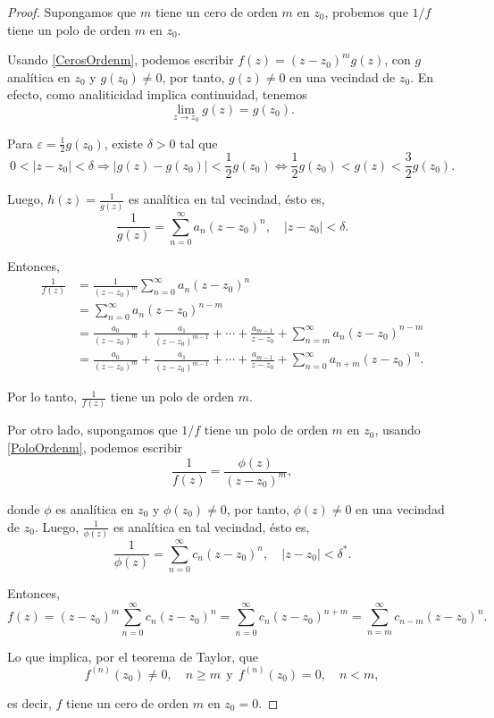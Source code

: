 \begin{proof}
Supongamos que $m$ tiene un cero de orden $m$ en $z_0$, probemos que $1/f$ tiene un polo de orden $m$ en $z_0$. 

Usando \eqref{CerosOrdenm}, podemos escribir $f(z) = (z-z_0)^m g(z)$, con $g$ analítica en $z_0$ y $g(z_0) \neq 0$, por tanto, $g(z) \neq 0$ en una vecindad de $z_0$. En efecto, como analiticidad implica continuidad, tenemos
$$\lim_{z\to z_0} g(z) = g(z_0).$$

Para $\varepsilon = \frac{1}{2} g(z_0)$, existe $\delta >0$ tal que
$$0 < |z-z_0| < \delta \Rightarrow |g(z) - g(z_0)| < \frac{1}{2} g(z_0) \Leftrightarrow \frac{1}{2} g(z_0) < g(z) < \frac{3}{2} g(z_0).$$

Luego, $h(z) = \frac{1}{g(z)}$ es analítica en tal vecindad, ésto es,
$$\frac{1}{g(z)} = \sum_{n=0}^{\infty} a_n (z-z_0)^n, \quad |z-z_0| < \delta.$$

Entonces,
\begin{align*}
  \frac{1}{f(z)} &= \frac{1}{(z-z_0)^m}  \sum_{n=0}^{\infty} a_n (z-z_0)^n \\
  &=   \sum_{n=0}^{\infty} a_n (z-z_0)^{n-m} \\
  &= \frac{a_0}{(z-z_0)^{m}} + \frac{a_1}{(z - z_0)^{m-1}} + \cdots + \frac{a_{m-1}}{z-z_0} +  \sum_{n=m}^{\infty} a_n (z-z_0)^{n-m} \\
  &=  \frac{a_0}{(z-z_0)^{m}} + \frac{a_1}{(z - z_0)^{m-1}} + \cdots + \frac{a_{m-1}}{z-z_0} +  \sum_{n=0}^{\infty} a_{n+m} (z-z_0)^{n}.
\end{align*}

Por lo tanto, $\frac{1}{f(z)}$ tiene un polo de orden $m$.

Por otro lado, supongamos que $1/f$ tiene un polo de orden $m$ en $z_0$, usando \eqref{PoloOrdenm}, podemos escribir
\begin{equation*}
\frac{1}{f(z)} = \frac{\phi(z)}{(z-z_0)^m}, 
\end{equation*}

donde $\phi$ es analítica en $z_0$ y $\phi(z_0) \neq 0$, por tanto, $\phi(z) \neq 0$ en una vecindad de $z_0$. Luego, $\frac{1}{\phi(z)}$ es analítica en tal vecindad, ésto es,
$$\frac{1}{\phi(z)} = \sum_{n=0}^{\infty} c_n(z-z_0)^n, \quad |z-z_0| < \delta^*.$$

Entonces,
$$  f(z) = (z-z_0)^m  \sum_{n=0}^{\infty} c_n(z-z_0)^n =   \sum_{n=0}^{\infty} c_n (z-z_0)^{n+m}= \sum_{n=m}^{\infty} c_{n-m} (z-z_0)^n.$$

Lo que implica, por el teorema de Taylor, que
$$f^{(n)}(z_0) \neq 0, \quad n \geq m~~\mbox{y}~~ f^{(n)}(z_0) = 0, \quad n < m,$$

es decir, $f$ tiene un cero de orden $m$ en $z_0 = 0$.
\end{proof}

